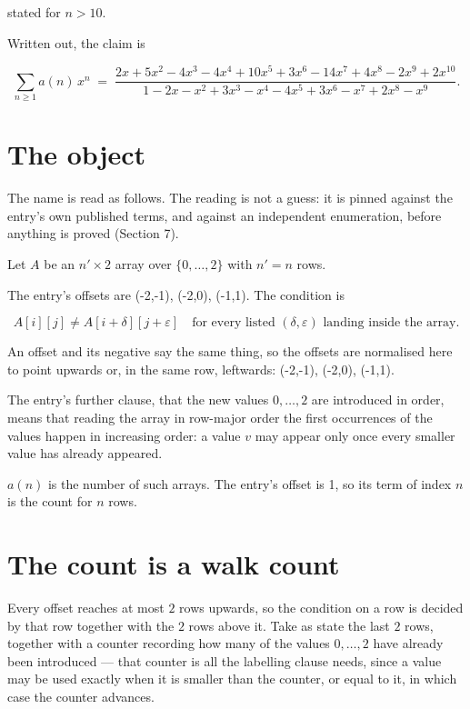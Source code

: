 \documentclass[11pt]{article}
\theoremstyle{definition}
\begin{document}
stated for $n > 10$.

Written out, the claim is

\[\sum_{n \ge 1} a(n)\,x^n \;=\; \frac{2x + 5x^{2} - 4x^{3} - 4x^{4} + 10x^{5} + 3x^{6} - 14x^{7} + 4x^{8} - 2x^{9} + 2x^{10}}{1 - 2x - x^{2} + 3x^{3} - x^{4} - 4x^{5} + 3x^{6} - x^{7} + 2x^{8} - x^{9}}.\]

\section{The object}

The name is read as follows. The reading is not a guess: it is pinned against the entry's own published terms, and against an independent enumeration, before anything is proved (Section 7).

Let $A$ be an $n' \times 2$ array over $\{0,\dots,2\}$ with $n' = n$ rows.

The entry's offsets are (-2,-1), (-2,0), (-1,1). The condition is

\[A[i][j] \ne A[i{+}\delta][j{+}\varepsilon]\quad\text{for every listed }(\delta,\varepsilon)\text{ landing inside the array.}\]

An offset and its negative say the same thing, so the offsets are normalised here to point upwards or, in the same row, leftwards: (-2,-1), (-2,0), (-1,1).

The entry's further clause, that the new values $0,\dots,2$ are introduced in order, means that reading the array in row-major order the first occurrences of the values happen in increasing order: a value $v$ may appear only once every smaller value has already appeared.

$a(n)$ is the number of such arrays. The entry's offset is 1, so its term of index $n$ is the count for $n$ rows.

\section{The count is a walk count}

Every offset reaches at most $2$ rows upwards, so the condition on a row is decided by that row together with the $2$ rows above it. Take as state the last $2$ rows, together with a counter recording how many of the values $0,\dots,2$ have already been introduced --- that counter is all the labelling clause needs, since a value may be used exactly when it is smaller than the counter, or equal to it, in which case the counter advances.
\end{document}
